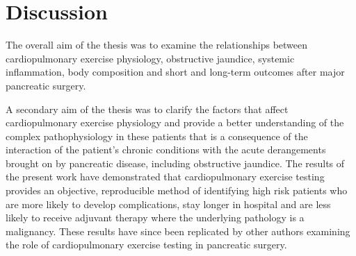 
\chapter{Discussion}
\label{ch_discussion}


\clearpage

The overall aim of the thesis was to examine the relationships between cardiopulmonary exercise physiology, obstructive jaundice, systemic inflammation, body composition and short and long-term outcomes after major pancreatic surgery. 

A secondary aim of the thesis was to clarify the factors that affect cardiopulmonary exercise physiology and provide a better understanding of the complex pathophysiology in these patients that is a consequence of the interaction of the patient's chronic conditions with the acute derangements brought on by pancreatic disease, including obstructive jaundice.
The results of the present work have demonstrated that cardiopulmonary exercise testing provides an objective, reproducible method of identifying high risk patients who are more likely to develop complications, stay longer in hospital and are less likely to receive adjuvant therapy where the underlying pathology is a malignancy. 
These results have since been replicated by other authors examining the role of cardiopulmonary exercise testing in pancreatic surgery. \parencite{ausania_effects_2012, ausania_double_2012, junejo_cardiopulmonary_2014}

